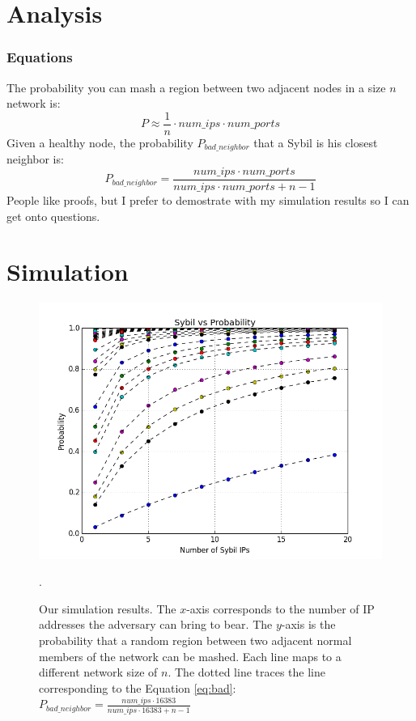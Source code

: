 \documentclass[11pt]{beamer}
\begin{document}
    \section{Analysis}
    \begin{frame}
        \frametitle{Equations}
        The probability you can mash a region between two adjacent nodes in a size $n$ network is:
         \begin{equation}
        P \approx \frac{1}{n}\cdot num\_ips \cdot num\_ports
        \end{equation}
        Given a healthy node, the probability $P_{bad\_neighbor}$ that a Sybil is his closest neighbor is:
        \begin{equation}
        P_{bad\_neighbor} =  \frac{num\_ips \cdot num\_ports}{num\_ips \cdot num\_ports + n - 1}
        \label{eq:bad}
        \end{equation}
        People like proofs, but I prefer to demostrate with my simulation results so I can get onto questions.
        
    \end{frame}
    
    \section{Simulation}
    \begin{frame}
        \begin{figure}
            \centering
            \includegraphics[width=0.65\linewidth]{ip_prob_all}
            \caption[foo]{Our simulation results.  
                The $x$-axis corresponds to the number of IP addresses the adversary can bring to bear.
                The $y$-axis is the probability that a random region between two adjacent normal members of the network can be mashed.
                Each line maps to a different network size of $n$.
                The dotted line traces the line corresponding to the Equation \ref{eq:bad}: $ P_{bad\_neighbor} =  \frac{num\_ips \cdot 16383}{num\_ips \cdot 16383 + n - 1}$}.
            \label{fig:exp2}
        \end{figure}
    \end{frame}
    
\end{document}
